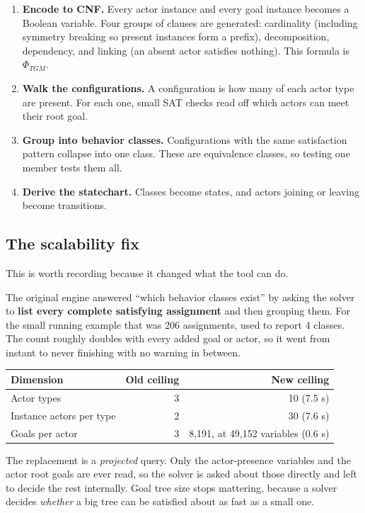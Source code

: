 \documentclass[11pt,a4paper]{article}
\begin{document}
\begin{enumerate}
\item \textbf{Encode to CNF.} Every actor instance and every goal instance becomes a
      Boolean variable. Four groups of clauses are generated: cardinality (including
      symmetry breaking so present instances form a prefix), decomposition, dependency,
      and linking (an absent actor satisfies nothing). This formula is $\Phi_{TGM}$.
\item \textbf{Walk the configurations.} A configuration is how many of each actor type
      are present. For each one, small SAT checks read off which actors can meet their
      root goal.
\item \textbf{Group into behavior classes.} Configurations with the same satisfaction
      pattern collapse into one class. These are equivalence classes, so testing one
      member tests them all.
\item \textbf{Derive the statechart.} Classes become states, and actors joining or
      leaving become transitions.
\end{enumerate}

\subsection{The scalability fix}

This is worth recording because it changed what the tool can do.

The original engine answered ``which behavior classes exist'' by asking the solver to
\textbf{list every complete satisfying assignment} and then grouping them. For the small
running example that was 206 assignments, used to report 4 classes. The count roughly
doubles with every added goal or actor, so it went from instant to never finishing with
no warning in between.

\begin{center}
\begin{tabular}{@{}lrr@{}}
\toprule
\textbf{Dimension} & \textbf{Old ceiling} & \textbf{New ceiling} \\
\midrule
Actor types & 3 & 10 (7.5 s) \\
Instance actors per type & 2 & 30 (7.6 s) \\
Goals per actor & 3 & 8{,}191, at 49{,}152 variables (0.6 s) \\
\bottomrule
\end{tabular}
\end{center}

The replacement is a \emph{projected} query. Only the actor-presence variables and the
actor root goals are ever read, so the solver is asked about those directly and left to
decide the rest internally. Goal tree size stops mattering, because a solver decides
\emph{whether} a big tree can be satisfied about as fast as a small one.
\end{document}
